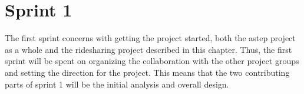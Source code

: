 \chapter{Sprint 1}
The first sprint concerns with getting the project started, both the \gls{astep} project as a whole and the ridesharing project described in this chapter.
Thus, the first sprint will be spent on organizing the collaboration with the other project groups and setting the direction for the project.
This means that the two contributing parts of sprint 1 will be the initial analysis and overall design.



%
%